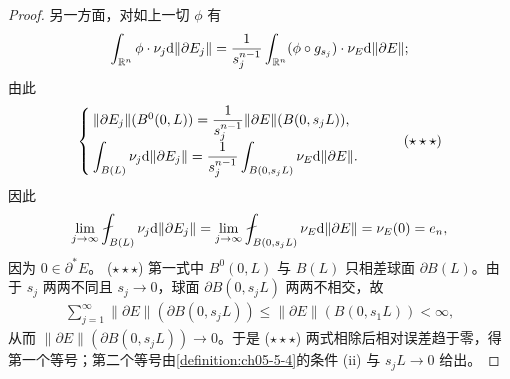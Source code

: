 \documentclass[../../main.tex]{subfiles}%
\begin{document}
\begin{proof}
另一方面，对如上一切 $\phi$ 有
\begin{align*}
\int_{\mathbb{R}^n}\phi\cdot\nu_j\mathrm{d}\lVert\partial E_j\rVert=\frac{1}{s_j^{n-1}}\int_{\mathbb{R}^n}(\phi\circ g_{s_j})\cdot\nu_E\mathrm{d}\lVert\partial E\rVert ;
\end{align*}
由此
\begin{align*}
\begin{cases}
\lVert\partial E_j\rVert(B^{0}(0,L))=\dfrac{1}{s_j^{n-1}}\lVert\partial E\rVert(B(0,s_jL)),\\[8pt]
\displaystyle\int_{B(L)}\nu_j\mathrm{d}\lVert\partial E_j\rVert=\frac{1}{s_j^{n-1}}\int_{B(0,s_jL)}\nu_E\mathrm{d}\lVert\partial E\rVert .
\end{cases}\qquad(\star\star\star)
\end{align*}
因此
\begin{align*}
\lim_{j\to\infty}\fint_{B(L)}\nu_j\diff\lVert\partial E_j\rVert
=\lim_{j\to\infty}\fint_{B(0,s_jL)}\nu_E\diff\lVert\partial E\rVert
=\nu_E(0)=e_n,
\end{align*}
因为 $0\in\partial^*E$。
($\star\star\star$) 第一式中 $B^{0}(0,L)$ 与 $B(L)$ 只相差球面 $\partial B(L)$。由于 $s_j$ 两两不同且 $s_j\to0$，球面 $\partial B(0,s_jL)$ 两两不相交，故
\begin{align*}
\sum_{j=1}^{\infty}\lVert\partial E\rVert(\partial B(0,s_jL))\leqslant\lVert\partial E\rVert(B(0,s_1L))<\infty,
\end{align*}
从而 $\lVert\partial E\rVert(\partial B(0,s_jL))\to0$。于是 ($\star\star\star$) 两式相除后相对误差趋于零，得第一个等号；第二个等号由\cref{definition:ch05-5-4}的条件 (ii) 与 $s_jL\to0$ 给出。%


\end{proof}
\end{document}

